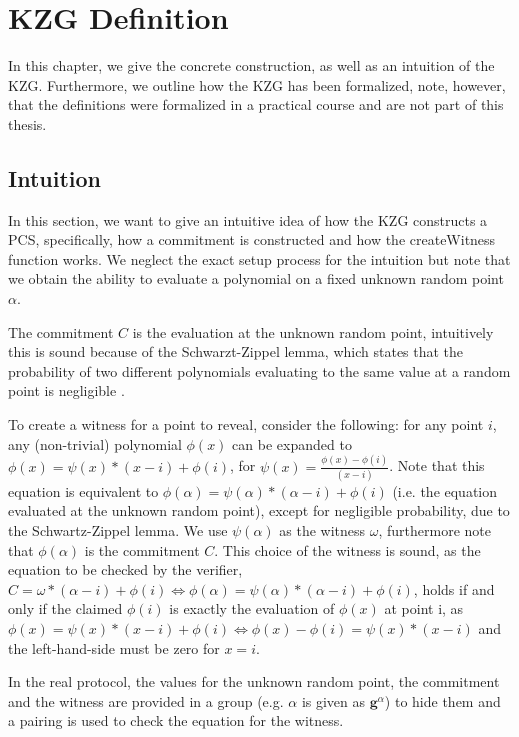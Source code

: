 \chapter{KZG Definition}\label{chapter:defs}
In this chapter, we give the concrete construction, as well as an intuition of the KZG.
Furthermore, we outline how the KZG has been formalized, note, however, that the definitions were formalized in a practical course and are not part of this thesis. 

\section{Intuition}
In this section, we want to give an intuitive idea of how the KZG constructs a PCS, specifically, how a commitment is constructed and how the createWitness function works. 
We neglect the exact setup process for the intuition but note that we obtain the ability to evaluate a polynomial on a fixed unknown random point $\alpha$.

The commitment $C$ is the evaluation at the unknown random point, intuitively this is sound because of the Schwarzt-Zippel lemma, which states that the probability of two different polynomials evaluating to the same value at a random point is negligible \parencite{thalerbook}.

To create a witness for a point to reveal, consider the following:
for any point $i$, any (non-trivial) polynomial $\phi(x)$ can be expanded to $\phi(x)=\psi(x)*(x-i) + \phi(i)$, for $\psi(x) = \frac{\phi(x)-\phi(i)}{(x-i)}$. Note that this equation is equivalent to $\phi(\alpha)=\psi(\alpha)*(\alpha-i) + \phi(i)$ (i.e. the equation evaluated at the unknown random point), except for negligible probability, due to the Schwartz-Zippel lemma. We use $\psi(\alpha)$ as the witness $\omega$, furthermore note that $\phi(\alpha)$ is the commitment $C$. 
This choice of the witness is sound, as the equation to be checked by the verifier,
$C=\omega*(\alpha-i) + \phi(i) \iff \phi(\alpha)=\psi(\alpha)*(\alpha-i) + \phi(i)$, holds if and only if the claimed $\phi(i)$ is exactly the evaluation of $\phi(x)$ at point i, as $\phi(x)=\psi(x)*(x-i) + \phi(i) \iff 
\phi(x)-\phi(i)=\psi(x)*(x-i)$ and the left-hand-side must be zero for $x=i$.

In the real protocol, the values for the unknown random point, the commitment and the witness are provided in a group (e.g. $\alpha$ is given as $\mathbf{g}^\alpha$) to hide them and a pairing is used to check the equation for the witness.

